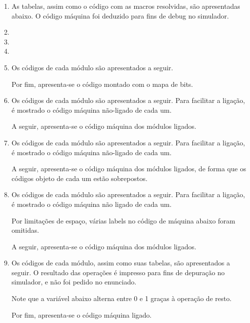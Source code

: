 \begin{enumerate}
    \item
    As tabelas, assim como o código com as macros resolvidas, são apresentadas abaixo.
    O código máquina foi deduzido para fins de debug no simulador.

    
    \item

    \item

    \item 
    
    \item
    Os códigos de cada módulo são apresentados a seguir.
    
    Por fim, apresenta-se o código montado com o mapa de bits.

    \item
    Os códigos de cada módulo são apresentados a seguir.
    Para facilitar a ligação, é mostrado 
    o código máquina não-ligado de cada um.

    A seguir, apresenta-se o código máquina dos módulos ligados.

    \item
    Os códigos de cada módulo são apresentados a seguir.
    Para facilitar a ligação, é mostrado 
    o código máquina não-ligado de cada um.

    A seguir, apresenta-se o código máquina dos módulos ligados,
    de forma que os códigos objeto de cada um estão sobrepostos.

    \item
    Os códigos de cada módulo são apresentados a seguir.
    Para facilitar a ligação, é mostrado 
    o código máquina não ligado de cada um.

    Por limitações de espaço, várias labels no código de máquina abaixo foram omitidas.

    A seguir, apresenta-se o código máquina dos módulos ligados.

    \item
    Os códigos de cada módulo, assim como suas tabelas, são apresentados a seguir.
    O resultado das operações é impresso para fins de depuração no simulador,
    e não foi pedido no enunciado.

    Note que a variável  abaixo alterna entre 0 e 1 graças à operação de resto.
    
    Por fim, apresenta-se o código máquina ligado.
\end{enumerate}